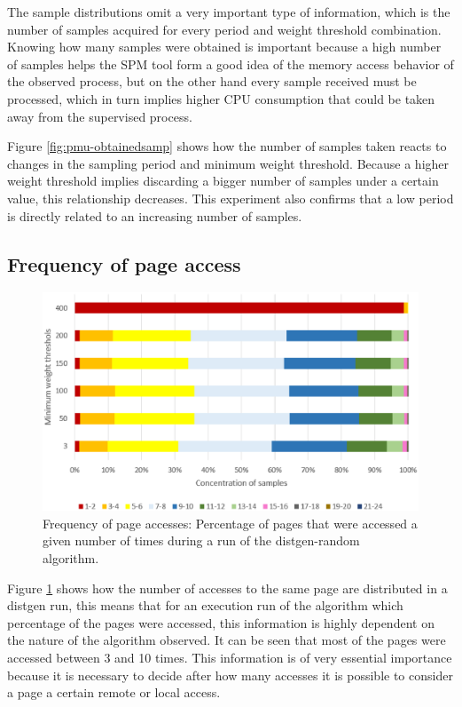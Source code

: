 The sample distributions omit a very important type of information, which is the number of samples acquired for every period and weight threshold combination. Knowing how many samples were obtained is important because a high number of samples helps the SPM tool form a good idea of the memory access behavior of the observed process, but on the other hand every sample received must be processed, which in turn implies higher CPU consumption that could be taken away from the supervised process. 

Figure \ref{fig:pmu-obtainedsamp} shows how the number of samples taken reacts to changes in the sampling period and minimum weight threshold. Because a higher weight threshold implies discarding a bigger number of samples under a certain value, this relationship decreases. This experiment also confirms that a low period is directly related to an increasing number of samples.

\subsection{Frequency of page access}\label{subsection:pmu-freqpgacc}

\begin{figure}[th]
	\centering
		\includegraphics[width=.8\textwidth]{figures/sample-concentration.eps}
		\caption{Frequency of page accesses: Percentage of pages that were accessed a given number of times during a run of the distgen-random algorithm.}
		\label{fig:pmu-concentsamp}
\end{figure}

Figure \ref{fig:pmu-concentsamp} shows how the number of accesses to the same page are distributed in a distgen run, this means that for an execution run of the algorithm which percentage of the pages were accessed, this information is highly dependent on the nature of the algorithm observed. It can be seen that most of the pages were accessed between 3 and 10 times. This information is of very essential importance because it is necessary to decide after how many accesses it is possible to consider a page a certain remote or local access.

